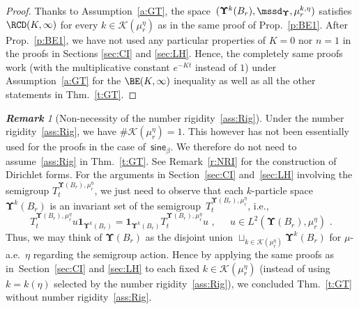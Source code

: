 \documentclass[11pt,letterpaper]{amsart}
\newcommand{\dom}[1]{\mathcal D(#1)}
\newcommand{\comma}{\,\,\mathrm{,}\;\,}
\newcommand{\fstop}{\,\,\mathrm{.}}
\newcommand{\purple}[1]{{\color{purple}#1}}
\newcommand{\QP}{{\mu}}
\newcommand{\dUpsilon}{{\mathbf \Upsilon}}
\newcommand{\U}{\dUpsilon}
\newcommand{\sine}{\mathsf{sine}}
\newcommand{\E}{\mathcal E}
\renewcommand{\1}{\mathbf 1}
\numberwithin{equation}{section}
\theoremstyle{plain}
\theoremstyle{definition}
\theoremstyle{remark}
\newtheorem{rem}[thm]{\bf Remark}%
\begin{document}
\begin{proof}
Thanks to Assumption~\ref{a:GT}, the space~$(\U^k(B_r), \mssd_\U, \QP_r^{k, \eta})$ satisfies $\RCD(K,\infty)$ for every $k \in \mathcal K(\mu_r^\eta)$ as in the same proof of Prop.~\ref{p:BE1}. 
After Prop.~\ref{p:BE1}, we have not used any particular properties of $K=0$ nor $n=1$ in the proofs in Sections \ref{sec:CI} and \ref{sec:LH}. Hence, the completely same proofs work (with the multiplicative constant $e^{-Kt}$ instead of $1$) under Assumption~\ref{a:GT} for the $\BE(K,\infty)$ inequality as well as all the other statements in Thm.~\ref{t:GT}.%
\end{proof}

\begin{rem}[Non-necessity of the number rigidity~\ref{ass:Rig}]
Under the number rigidity~\ref{ass:Rig}, we have $\#\mathcal K(\mu^\eta_r) =1$. This however has not been essentially used for the proofs in the case of~$\sine_\beta$. We therefore do not need to assume~\ref{ass:Rig} in Thm.~\ref{t:GT}. See Remark~\ref{r:NRI} for the construction of Dirichlet forms. For the arguments in Section~\ref{sec:CI} and~\ref{sec:LH}  involving the semigroup $T_t^{\U(B_r), \QP_r^\eta}$, we just need to observe that each $k$-particle space~$\U^k(B_r)$ is an invariant set of the semigroup~$T_t^{\U(B_r), \QP_r^\eta}$, i.e., $$T_t^{\U(B_r), \QP_r^\eta}u\1_{\U^k(B_r)} = \1_{\U^k(B_r)}T_t^{\U(B_r), \QP_r^\eta}u \comma \quad u \in L^2(\U(B_r), \QP_r^\eta)\fstop$$
Thus, we may think of $\U(B_r)$ as the disjoint union $\sqcup_{k \in \mathcal K(\mu^\eta_r)}\U^{k}(B_r)$ for $\QP$-a.e.~$\eta$ regarding the semigroup action. %
Hence by applying the same proofs as in~Section~\ref{sec:CI} and \ref{sec:LH} to each fixed $k \in \mathcal K(\mu^\eta_r)$ (instead of using $k=k(\eta)$ selected by the number rigidity~\ref{ass:Rig}), we concluded Thm.~\ref{t:GT} without number rigidity~\ref{ass:Rig}. 
\end{rem}
\end{document}
